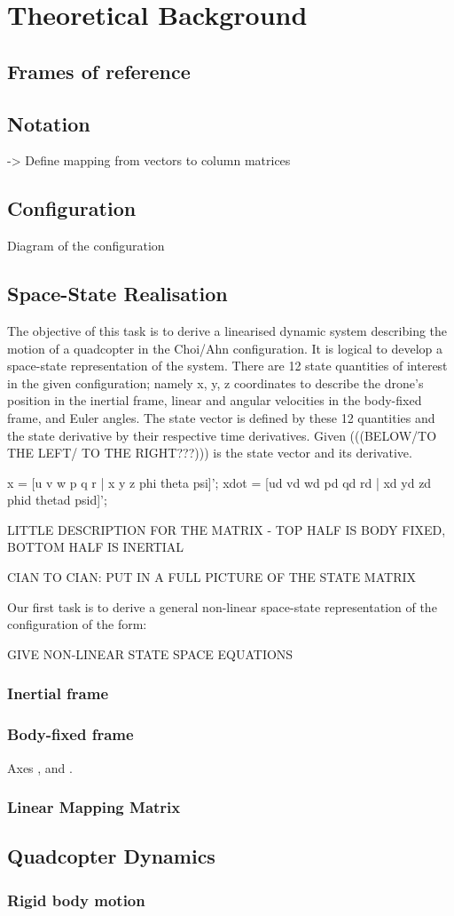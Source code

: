 \section{Theoretical Background}

\subsection{Frames of reference}

\subsection{Notation} %
-> Define mapping from vectors to column matrices
\subsection{Configuration}
Diagram of the configuration

\subsection{Space-State Realisation}
The objective of this task is to derive a linearised dynamic system describing the motion of a quadcopter in the Choi/Ahn configuration. It is logical to develop a space-state representation of the system. There are 12 state quantities of interest in the given configuration; namely x, y, z coordinates to describe the drone's position in the inertial frame, linear and angular velocities in the body-fixed frame, and Euler angles. The state vector is defined by these 12 quantities and the state derivative by their respective time derivatives. Given (((BELOW/TO THE LEFT/ TO THE RIGHT???))) is the state vector and its derivative.

x = [u v w p q r | x y z phi theta psi]';
xdot = [ud vd wd pd qd rd | xd yd zd phid thetad psid]';

LITTLE DESCRIPTION FOR THE MATRIX - TOP HALF IS BODY FIXED, BOTTOM HALF IS INERTIAL

CIAN TO CIAN: PUT IN A FULL PICTURE OF THE STATE MATRIX

Our first task is to derive a general non-linear space-state representation of the configuration of the form:

GIVE NON-LINEAR STATE SPACE EQUATIONS

\subsubsection[Inertial frame]{Inertial frame } %
\subsubsection[Body-fixed frame]{Body-fixed frame }
Axes ,  and .
\subsubsection[Linear Mapping Matrix]{Linear Mapping Matrix }
\label{sss:lmapmatQ}

\subsection{Quadcopter Dynamics}
\subsubsection{Rigid body motion}
\label{rigid-body-motion}